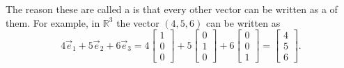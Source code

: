 The reason these are called a \emph{} is that every other
vector can be written as a \emph{} of them.
For example, in ${\mathbb R}^3$ the vector $(4,5,6)$ can be written as
\begin{equation*}
4 \vec{e}_1 + 
5 \vec{e}_2 + 
6 \vec{e}_3
=
4
\begin{bmatrix}
1 \\ 0 \\ 0
\end{bmatrix}
+
5
\begin{bmatrix}
0 \\ 1 \\ 0
\end{bmatrix}
+
6
\begin{bmatrix}
0 \\ 0 \\ 1
\end{bmatrix}
=
\begin{bmatrix}
4 \\ 5 \\ 6
\end{bmatrix} .
\end{equation*}

